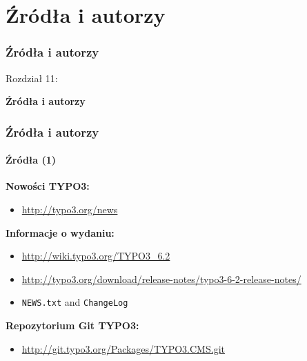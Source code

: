 %
\section{Źródła i autorzy}
\begin{frame}[fragile]
	\frametitle{Źródła i autorzy}

	\begin{center}\huge{Rozdział 11:}\end{center}
	\begin{center}\huge{\color{typo3darkgrey}\textbf{Źródła i autorzy}}\end{center}

\end{frame}


\begin{frame}[fragile]
	\frametitle{Źródła i autorzy}
	\framesubtitle{Źródła (1)}

	\textbf{Nowości TYPO3:}
		\begin{itemize}\smaller
			\item \url{http://typo3.org/news}
		\end{itemize}

	\textbf{Informacje o wydaniu:}
		\begin{itemize}\smaller
			\item \url{http://wiki.typo3.org/TYPO3_6.2}
			\item \url{http://typo3.org/download/release-notes/typo3-6-2-release-notes/}
			\item \texttt{NEWS.txt} and \texttt{ChangeLog}
		\end{itemize}

	\textbf{Repozytorium Git TYPO3:}
		\begin{itemize}\smaller
			\item \url{http://git.typo3.org/Packages/TYPO3.CMS.git}
		\end{itemize}

\end{frame}


